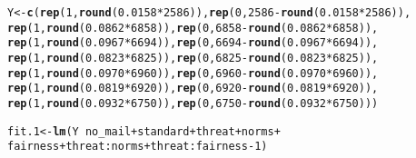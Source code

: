 \documentclass[11pt,notitlepage]{article}\usepackage[]{graphicx}\usepackage[]{color}
\makeatletter
\newcommand{\hlnum}[1]{\textcolor[rgb]{0.686,0.059,0.569}{#1}}%
\newcommand{\hlopt}[1]{\textcolor[rgb]{0,0,0}{#1}}%
\newcommand{\hlstd}[1]{\textcolor[rgb]{0.345,0.345,0.345}{#1}}%
\newcommand{\hlkwb}[1]{\textcolor[rgb]{0.69,0.353,0.396}{#1}}%
\newcommand{\hlkwd}[1]{\textcolor[rgb]{0.737,0.353,0.396}{\textbf{#1}}}%
\newenvironment{kframe}{%
 \def\at@end@of@kframe{}%
 \ifinner\ifhmode%
  \def\at@end@of@kframe{\end{minipage}}%
  \begin{minipage}{\columnwidth}%
 \fi\fi%
 \def\FrameCommand##1{\hskip\@totalleftmargin \hskip-\fboxsep
 \colorbox{shadecolor}{##1}\hskip-\fboxsep
     \hskip-\linewidth \hskip-\@totalleftmargin \hskip\columnwidth}%
 \MakeFramed {\advance\hsize-\width
   \@totalleftmargin\z@ \linewidth\hsize
   \@setminipage}}%
 {\par\unskip\endMakeFramed%
 \at@end@of@kframe}
\newenvironment{knitrout}{}{} %
\makeatother
\begin{document}
\begin{enumerate}[a)]
\begin{knitrout}
\begin{kframe}
\begin{alltt}
\hlstd{Y} \hlkwb{<-} \hlkwd{c}\hlstd{(}\hlkwd{rep}\hlstd{(}\hlnum{1}\hlstd{,} \hlkwd{round}\hlstd{(}\hlnum{0.0158}\hlopt{*}\hlnum{2586}\hlstd{)),} \hlkwd{rep}\hlstd{(}\hlnum{0}\hlstd{,} \hlnum{2586} \hlopt{-} \hlkwd{round}\hlstd{(}\hlnum{0.0158}\hlopt{*}\hlnum{2586}\hlstd{)),}
       \hlkwd{rep}\hlstd{(}\hlnum{1}\hlstd{,} \hlkwd{round}\hlstd{(}\hlnum{0.0862}\hlopt{*}\hlnum{6858}\hlstd{)),} \hlkwd{rep}\hlstd{(}\hlnum{0}\hlstd{,} \hlnum{6858} \hlopt{-} \hlkwd{round}\hlstd{(}\hlnum{0.0862}\hlopt{*}\hlnum{6858}\hlstd{)),}
       \hlkwd{rep}\hlstd{(}\hlnum{1}\hlstd{,} \hlkwd{round}\hlstd{(}\hlnum{0.0967}\hlopt{*}\hlnum{6694}\hlstd{)),} \hlkwd{rep}\hlstd{(}\hlnum{0}\hlstd{,} \hlnum{6694} \hlopt{-} \hlkwd{round}\hlstd{(}\hlnum{0.0967}\hlopt{*}\hlnum{6694}\hlstd{)),}
       \hlkwd{rep}\hlstd{(}\hlnum{1}\hlstd{,} \hlkwd{round}\hlstd{(}\hlnum{0.0823}\hlopt{*}\hlnum{6825}\hlstd{)),} \hlkwd{rep}\hlstd{(}\hlnum{0}\hlstd{,} \hlnum{6825} \hlopt{-} \hlkwd{round}\hlstd{(}\hlnum{0.0823}\hlopt{*}\hlnum{6825}\hlstd{)),}
       \hlkwd{rep}\hlstd{(}\hlnum{1}\hlstd{,} \hlkwd{round}\hlstd{(}\hlnum{0.0970}\hlopt{*}\hlnum{6960}\hlstd{)),} \hlkwd{rep}\hlstd{(}\hlnum{0}\hlstd{,} \hlnum{6960} \hlopt{-} \hlkwd{round}\hlstd{(}\hlnum{0.0970}\hlopt{*}\hlnum{6960}\hlstd{)),}
       \hlkwd{rep}\hlstd{(}\hlnum{1}\hlstd{,} \hlkwd{round}\hlstd{(}\hlnum{0.0819}\hlopt{*}\hlnum{6920}\hlstd{)),} \hlkwd{rep}\hlstd{(}\hlnum{0}\hlstd{,} \hlnum{6920} \hlopt{-} \hlkwd{round}\hlstd{(}\hlnum{0.0819}\hlopt{*}\hlnum{6920}\hlstd{)),}
       \hlkwd{rep}\hlstd{(}\hlnum{1}\hlstd{,} \hlkwd{round}\hlstd{(}\hlnum{0.0932}\hlopt{*}\hlnum{6750}\hlstd{)),} \hlkwd{rep}\hlstd{(}\hlnum{0}\hlstd{,} \hlnum{6750} \hlopt{-} \hlkwd{round}\hlstd{(}\hlnum{0.0932}\hlopt{*}\hlnum{6750}\hlstd{)))}

\hlstd{fit.1} \hlkwb{<-} \hlkwd{lm}\hlstd{(Y}\hlopt{~}\hlstd{no_mail} \hlopt{+} \hlstd{standard} \hlopt{+} \hlstd{threat} \hlopt{+} \hlstd{norms} \hlopt{+}
              \hlstd{fairness} \hlopt{+} \hlstd{threat}\hlopt{:}\hlstd{norms} \hlopt{+} \hlstd{threat}\hlopt{:}\hlstd{fairness} \hlopt{-} \hlnum{1}\hlstd{)}


\end{alltt}
\end{kframe}
\end{knitrout}
\end{enumerate}
\end{document}

